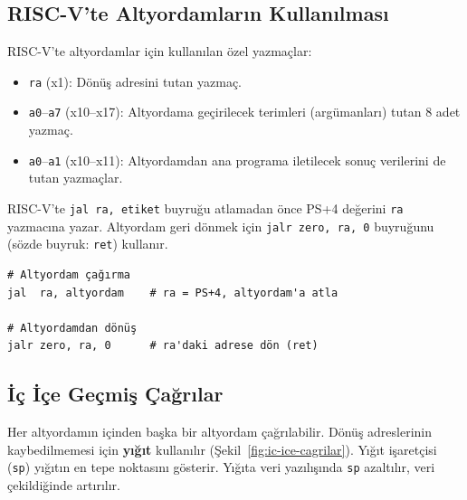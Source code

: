 \subsection{RISC-V'te Altyordamların Kullanılması}

RISC-V'te altyordamlar için kullanılan özel yazmaçlar:
\begin{itemize}
\item \texttt{ra} (x1): Dönüş adresini tutan yazmaç.
\item \texttt{a0}--\texttt{a7} (x10--x17): Altyordama geçirilecek terimleri (argümanları) tutan 8 adet yazmaç.
\item \texttt{a0}--\texttt{a1} (x10--x11): Altyordamdan ana programa iletilecek sonuç verilerini de tutan yazmaçlar.
\end{itemize}

RISC-V'te \texttt{jal ra, etiket} buyruğu atlamadan önce PS+4 değerini \texttt{ra} yazmacına yazar. Altyordam geri dönmek için \texttt{jalr zero, ra, 0} buyruğunu (sözde buyruk: \texttt{ret}) kullanır.

\begin{lstlisting}[style=riscv]
# Altyordam çağırma
jal  ra, altyordam    # ra = PS+4, altyordam'a atla

# Altyordamdan dönüş
jalr zero, ra, 0      # ra'daki adrese dön (ret)
\end{lstlisting}

\subsection{İç İçe Geçmiş Çağrılar}

Her altyordamın içinden başka bir altyordam çağrılabilir. Dönüş adreslerinin kaybedilmemesi için \textbf{yığıt} kullanılır (Şekil~\ref{fig:ic-ice-cagrilar}). Yığıt işaretçisi (\texttt{sp}) yığıtın en tepe noktasını gösterir. Yığıta veri yazılışında \texttt{sp} azaltılır, veri çekildiğinde artırılır.

